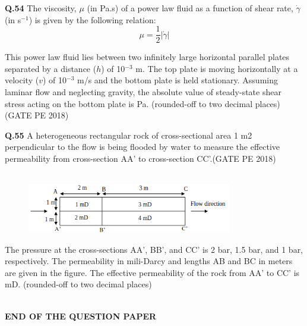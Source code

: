 \documentclass[12pt,a4paper]{article}
\begin{document}
\vspace{0.7cm}

\noindent\textbf{Q.54} The viscosity, $\mu$ (in Pa.s) of a power law fluid as a function of shear rate, $\dot{\gamma}$ (in s$^{-1}$) is given by the following relation: 
\[ \mu = \frac{1}{2} |\dot{\gamma}| \]

This power law fluid lies between two infinitely large horizontal parallel plates separated by a distance ($h$) of 10$^{-3}$ m. The top plate is moving horizontally at a velocity ($v$) of 10$^{-3}$ m/s and the bottom plate is held stationary. Assuming laminar flow and neglecting gravity, the absolute value of steady-state shear stress acting on the bottom plate is \underline{\hspace{2cm}} Pa. (rounded-off to two decimal places) \hfill (GATE PE 2018)

\pagebreak

\noindent
\textbf{Q.55} A heterogeneous rectangular rock of cross-sectional area 1 m2 perpendicular to the flow is
being flooded by water to measure the effective permeability from cross-section AA’ to
cross-section CC’.\hfill(GATE PE 2018)\\\\

\begin{figure}[h!]
  \centering
  \includegraphics[width=0.8\textwidth]{pic12.png} 
\end{figure}

The pressure at the cross-sections AA’, BB’, and CC’ is 2 bar, 1.5 bar, and 1 bar,
respectively. The permeability in mili-Darcy and lengths AB and BC in meters are given in
the figure. The effective permeability of the rock from AA’ to CC’ is \underline{\hspace{4cm}}mD. 
(rounded-off to two decimal places)\\\\
\vspace{6cm}
\begin{center}
	{\LARGE \textbf{END OF THE QUESTION PAPER}}
\end{center}
\end{document}
